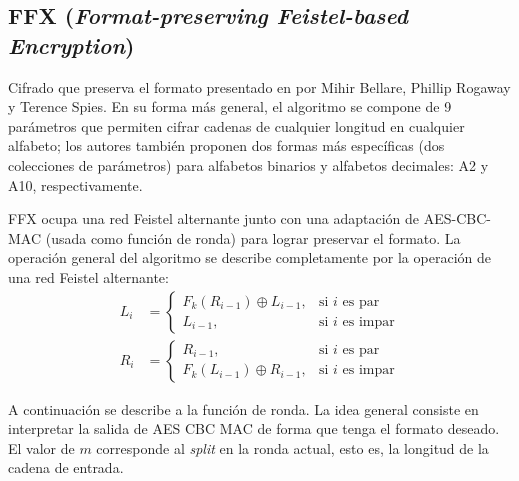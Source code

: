 %
%

\subsection{FFX (\textit{Format-preserving Feistel-based Encryption})}

Cifrado que preserva el formato presentado en \cite{ffx_1} por Mihir Bellare,
Phillip Rogaway y Terence Spies.  En su forma más general, el algoritmo se
compone de 9 parámetros que permiten cifrar cadenas de cualquier longitud en
cualquier alfabeto; los autores también proponen dos formas más específicas (dos
colecciones de parámetros) para alfabetos binarios y alfabetos decimales: A2 y
A10, respectivamente.


FFX ocupa una red Feistel alternante junto con una adaptación de AES-CBC-MAC
(usada como función de ronda) para lograr preservar el formato. La operación
general del algoritmo se describe completamente por la operación de una red
Feistel alternante:
\begin{equation}
  \begin{split}
    L_{i} &=
    \begin{cases}
      F_k(R_{i - 1}) \oplus L_{i - 1},  & \text{si } i \text{ es par} \\
      L_{i - 1},                        & \text{si } i \text{ es impar}
    \end{cases}
    \\
    R_{i} &=
    \begin{cases}
      R_{i - 1},                        & \text{si } i \text{ es par} \\
      F_k(L_{i - 1}) \oplus R_{i - 1},  & \text{si } i \text{ es impar}
    \end{cases}
  \end{split}
\end{equation}


A continuación se describe a la función de ronda. La idea general
consiste en interpretar la salida de AES CBC MAC de forma que tenga el formato
deseado. El valor de $ m $ corresponde al \textit{split} en la ronda actual,
esto es, la longitud de la cadena de entrada.


